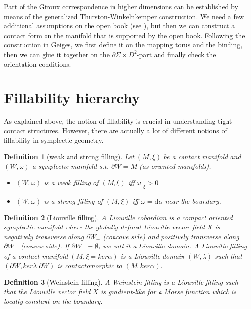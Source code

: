 \documentclass{amsart}
\newtheorem{definition}{Definition}
\renewcommand*{\d}{\mathrm{d}}
\begin{document}
Part of the Giroux correspondence in higher dimensions can be established by means 
of the generalized Thurston-Winkelnkemper construction.
We need a few additional assumptions on the open book (see \cite[Theorem 7.3.3]{Geiges08}), but then we can construct a contact form on the manifold that is supported by the open book.
Following the construction in Geiges, we first define it on the mapping torus and the binding, then we can glue it together on the $\partial \Sigma \times D^2$-part and finally check
the orientation conditions.

\section*{Fillability hierarchy}
As explained above, the notion of fillability is crucial in understanding tight contact structures. However, there are actually a lot of different notions of fillability in symplectic geometry.

\begin{definition}[weak and strong filling]
    Let $(M, \xi)$ be a contact manifold and $(W, \omega)$ a symplectic manifold s.t. $\partial W = M$ (as oriented manifolds).
    \begin{itemize}
        \item $(W, \omega)$ is a weak filling of $(M, \xi)$ iff $\omega|_\xi > 0$
        \item $(W, \omega)$ is a strong filling of $(M, \xi)$ iff $\omega = \d \alpha$ near the boundary.
    \end{itemize}
\end{definition}


\begin{definition}[Liouville filling]
    A Liouville cobordism is a compact oriented symplectic manifold where the globally defined Liouville vector field $X$ is negatively transverse  along $\partial W_-$ (concave side) and positively transverse along $\partial W_+$ (convex side).
    If $\partial W_- = \emptyset$, we call it a Liouville domain.
    A Liouville filling of a contact manifold $(M, \xi = ker \alpha)$ is a Liouville domain $(W, \lambda)$ such that $(\partial W, ker \lambda|\partial W)$ is contactomorphic to $(M, ker \alpha)$.
\end{definition}

\begin{definition}[Weinstein filling]
    A Weinstein filling is a Liouville filling such that the Liouville vector field $X$ is gradient-like for a Morse function which is locally constant on the boundary.
\end{definition}
\end{document}

